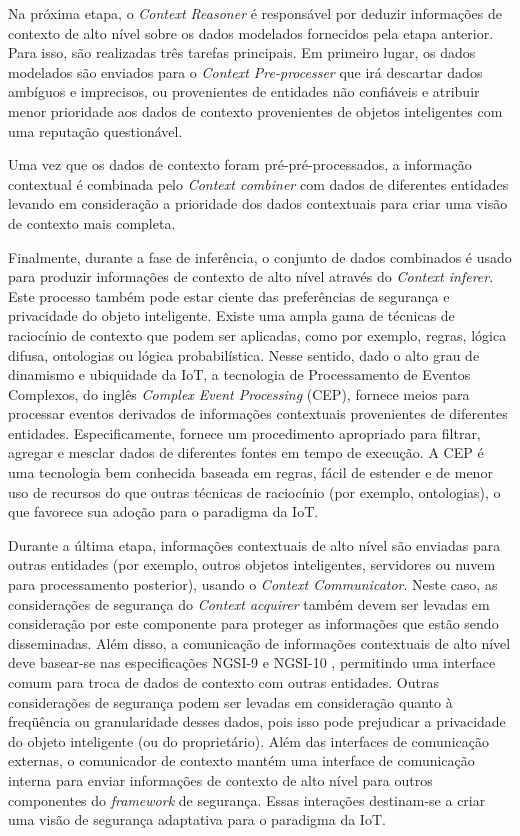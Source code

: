 \documentclass[tid,table]{texufpel} %
\begin{document}
Na próxima etapa, o \textit{Context Reasoner} é responsável por deduzir informações de contexto de alto nível sobre os dados modelados fornecidos pela etapa anterior. Para isso, são realizadas três tarefas principais. Em primeiro lugar, os dados modelados são enviados para o \textit{Context Pre-processer} que irá descartar dados ambíguos e imprecisos, ou provenientes de entidades não confiáveis e atribuir menor prioridade aos dados de contexto provenientes de objetos inteligentes com uma reputação questionável. 

Uma vez que os dados de contexto foram pré-pré-processados, a informação contextual é combinada pelo \textit{Context combiner} com dados de diferentes entidades levando em consideração a prioridade dos dados contextuais para criar uma visão de contexto mais completa. 

Finalmente, durante a fase de inferência, o conjunto de dados combinados é usado para produzir informações de contexto de alto nível através do \textit{Context inferer}. Este processo também pode estar ciente das preferências de segurança e privacidade do objeto inteligente. Existe uma ampla gama de técnicas de raciocínio de contexto que podem ser aplicadas, como por exemplo, regras, lógica difusa, ontologias ou lógica probabilística. Nesse sentido, dado o alto grau de dinamismo e ubiquidade da IoT, a tecnologia de Processamento de Eventos Complexos, do inglês \textit{Complex Event Processing} (CEP), fornece meios para processar eventos derivados de informações contextuais provenientes de diferentes entidades. Especificamente, fornece um procedimento apropriado para filtrar, agregar e mesclar dados de diferentes fontes em tempo de execução. A CEP é uma tecnologia bem conhecida baseada em regras, fácil de estender e de menor uso de recursos do que outras técnicas de raciocínio (por exemplo, ontologias), o que favorece sua adoção para o paradigma da IoT.

Durante a última etapa, informações contextuais de alto nível são enviadas para outras entidades (por exemplo, outros objetos inteligentes, servidores ou nuvem para processamento posterior), usando o \textit{Context Communicator}. Neste caso, as considerações de segurança do \textit{Context acquirer} também devem ser levadas em consideração por este componente para proteger as informações que estão sendo disseminadas. Além disso, a comunicação de informações contextuais de alto nível deve basear-se nas especificações NGSI-9 e NGSI-10 \cite{oma12}, permitindo uma interface comum para troca de dados de contexto com outras entidades. Outras considerações de segurança podem ser levadas em consideração quanto à freqüência ou granularidade desses dados, pois isso pode prejudicar a privacidade do objeto inteligente (ou do proprietário). Além das interfaces de comunicação externas, o comunicador de contexto mantém uma interface de comunicação interna para enviar informações de contexto de alto nível para outros componentes do \textit{framework} de segurança. Essas interações destinam-se a criar uma visão de segurança adaptativa para o paradigma da IoT.
\end{document}
